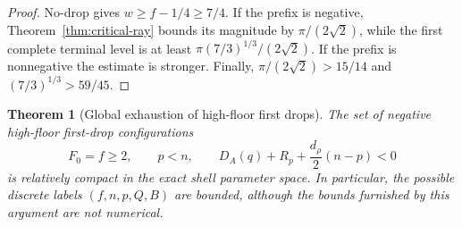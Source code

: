 \documentclass[11pt]{article}
\newtheorem{theorem}{Theorem}[section]
\theoremstyle{remark}
\begin{document}
\begin{proof}
No-drop gives $w\geq f-1/4\geq7/4$.  If the prefix is negative,
Theorem~\ref{thm:critical-ray} bounds its magnitude by
$\pi/(2\sqrt2)$, while the first complete terminal level is at least
$\pi(7/3)^{1/3}/(2\sqrt2)$.  If the prefix is nonnegative the estimate
is stronger.  Finally, $\pi/(2\sqrt2)>15/14$ and
$(7/3)^{1/3}>59/45$.
\end{proof}

\begin{theorem}[Global exhaustion of high-floor first drops]
\label{thm:high-floor-first-drop-exhaustion}
The set of negative high-floor first-drop configurations
\[
 F_0=f\geq2,\qquad p<n,\qquad
 D_A(q)+R_p+\frac{d_\rho}{2}(n-p)<0
\]
is relatively compact in the exact shell parameter space.  In particular,
the possible discrete labels $(f,n,p,Q,B)$ are bounded, although the
bounds furnished by this argument are not numerical.
\end{theorem}
\end{document}
